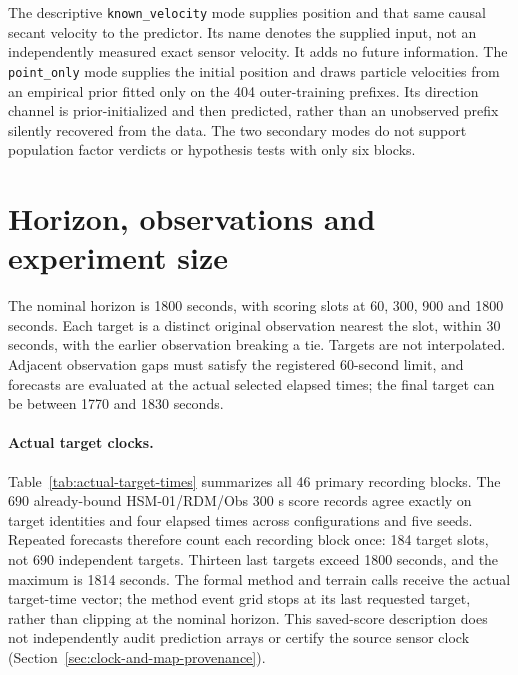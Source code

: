 The descriptive \texttt{known\_velocity} mode supplies position and that same
causal secant velocity to the predictor. Its name denotes the supplied input,
not an independently measured exact sensor velocity. It adds no future
information. The \texttt{point\_only} mode supplies the initial position and
draws particle velocities from an empirical prior fitted only on the 404
outer-training prefixes. Its direction channel is prior-initialized and then
predicted, rather than an unobserved prefix silently recovered from the data.
The two secondary modes do not support population factor verdicts or
hypothesis tests with only six blocks.


\section{Horizon, observations and experiment size}
\label{sec:inventory}\hypertarget{sec:inventory}{}
The nominal horizon is 1800 seconds, with scoring slots at 60, 300, 900 and
1800 seconds. Each target is a distinct original observation nearest the
slot, within 30 seconds, with the earlier observation breaking a tie.
Targets are not interpolated. Adjacent observation gaps must satisfy the
registered 60-second limit, and forecasts are evaluated at the actual selected
elapsed times; the final target can be between 1770 and 1830 seconds.

\paragraph{Actual target clocks.}\label{sec:target-times}\hypertarget{sec:target-times}{}
Table~\ref{tab:actual-target-times} summarizes all 46 primary recording blocks.
The 690 already-bound HSM-01/RDM/Obs 300 s score records agree exactly on target
identities and four elapsed times across configurations and five seeds.
Repeated forecasts therefore count each recording block once: 184 target
slots, not 690 independent targets. Thirteen last targets exceed 1800 seconds,
and the maximum is 1814 seconds. The formal method and terrain calls receive
the actual target-time vector; the method event grid stops at its last
requested target, rather than clipping at the nominal horizon.
This saved-score description does not independently audit prediction arrays
or certify the source sensor clock (Section~\ref{sec:clock-and-map-provenance}).


